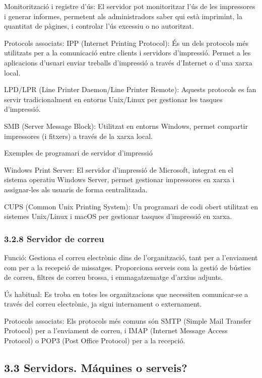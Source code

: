 \documentclass[
  a4paper,
]{article}
\begin{document}
Monitorització i registre d'ús: El servidor pot monitoritzar l'ús de les
impressores i generar informes, permetent als administradors saber qui
està imprimint, la quantitat de pàgines, i controlar l'ús excessiu o no
autoritzat.

Protocols associats: IPP (Internet Printing Protocol): És un dels
protocols més utilitzats per a la comunicació entre clients i servidors
d'impressió. Permet a les aplicacions d'usuari enviar treballs
d'impressió a través d'Internet o d'una xarxa local.

LPD/LPR (Line Printer Daemon/Line Printer Remote): Aquests protocols es
fan servir tradicionalment en entorns Unix/Linux per gestionar les
tasques d'impressió.

SMB (Server Message Block): Utilitzat en entorns Windows, permet
compartir impressores (i fitxers) a través de la xarxa local.

Exemples de programari de servidor d'impressió

Windows Print Server: El servidor d'impressió de Microsoft, integrat en
el sistema operatiu Windows Server, permet gestionar impressores en
xarxa i assignar-les als usuaris de forma centralitzada.

CUPS (Common Unix Printing System): Un programari de codi obert
utilitzat en sistemes Unix/Linux i macOS per gestionar tasques
d'impressió en xarxa.

\subsubsection{3.2.8 Servidor de correu}\label{servidor-de-correu}

Funció: Gestiona el correu electrònic dins de l'organització, tant per a
l'enviament com per a la recepció de missatges. Proporciona serveis com
la gestió de bústies de correu, filtres de correu brossa, i
emmagatzematge d'arxius adjunts.

Ús habitual: Es troba en totes les organitzacions que necessiten
comunicar-se a través del correu electrònic, ja sigui internament o
externament.

Protocols associats: Els protocols més comuns són SMTP (Simple Mail
Transfer Protocol) per a l'enviament de correu, i IMAP (Internet Message
Access Protocol) o POP3 (Post Office Protocol) per a la recepció.

\subsection{3.3 Servidors. Máquines o
serveis?}\label{servidors.-muxe1quines-o-serveis}
\end{document}
